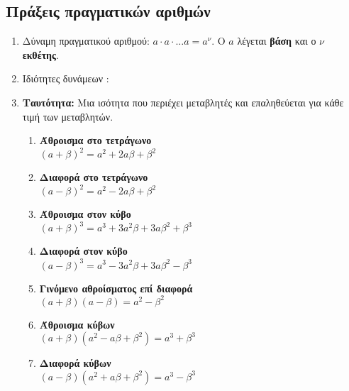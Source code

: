\documentclass[a4paper,11pt]{article}
\begin{document}
\subsection{Πράξεις πραγματικών αριθμών}
\begin{enumerate}
\item Δύναμη πραγματικού αριθμού: $ a\cdot a\cdot\ldots a=a^\nu $. Ο $ a $ λέγεται \textbf{βάση} και ο $ \nu $ \textbf{εκθέτης}.
\item Ιδιότητες δυνάμεων : 
\begin{multicols}{2}
\end{multicols}
\item \textbf{Ταυτότητα:} Μια ισότητα που περιέχει μεταβλητές και επαληθεύεται για κάθε τιμή των μεταβλητών.
\begin{multicols}{2}
\begin{enumerate}[itemsep=0mm,label=\bf\arabic*.]
\item \parbox[t]{7cm}{\textbf{Άθροισμα στο τετράγωνο}\\$ (a+\beta)^2=a^2+2a\beta+\beta^2 $}
\item \parbox[t]{7cm}{\textbf{Διαφορά στο τετράγωνο}\\$ (a-\beta)^2=a^2-2a\beta+\beta^2 $}
\item \parbox[t]{7cm}{\textbf{Άθροισμα στον κύβο}\\$ (a+\beta)^3=a^3+3a^2\beta+3a\beta^2+\beta^3 $}
\item \parbox[t]{7cm}{\textbf{Διαφορά στον κύβο}\\$ (a-\beta)^3=a^3-3a^2\beta+3a\beta^2-\beta^3 $}
\item \parbox[t]{7cm}{\textbf{Γινόμενο αθροίσματος επί διαφορά}\\$ (a+\beta)(a-\beta)=a^2-\beta^2 $}
\item \parbox[t]{7cm}{\textbf{Άθροισμα κύβων}\\$ (a+\beta)\left(a^2-a\beta+\beta^2 \right)=a^3+\beta^3 $}
\item \parbox[t]{7cm}{\textbf{Διαφορά κύβων}\\$ (a-\beta)\left(a^2+a\beta+\beta^2 \right)=a^3-\beta^3 $}
\end{enumerate}
\end{multicols}
\end{enumerate}
\end{document}
